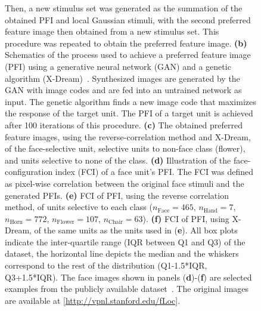 \documentclass[sn-mathphys-num]{sn-jnl}%
\theoremstyle{thmstyleone}%
\theoremstyle{thmstyletwo}%
\theoremstyle{thmstylethree}%
\begin{document}
\begin{figure}[!htb]
{		%
		Then, a new stimulus set was generated as the summation of the obtained PFI and local Gaussian stimuli, with the second preferred feature image then obtained from a new stimulus set.
		This procedure was repeated to obtain the preferred feature image.
		\textbf{(b)} Schematics of the process used to achieve a preferred feature image (PFI) using a generative neural network (GAN) and a genetic algorithm (X-Dream)~\cite{ponce2019evolving}.
		Synthesized images are generated by the GAN with image codes and are fed into an untrained network as input.
		The genetic algorithm finds a new image code that maximizes the response of the target unit.
		The PFI of a target unit is achieved after 100 iterations of this procedure.
		\textbf{(c)} The obtained preferred feature images, using the reverse-correlation method and X-Dream, of the face-selective unit, selective units to non-face class (flower), and units selective to none of the class.
		\textbf{(d)} Illustration of the face-configuration index (FCI) of a face unit's PFI.
		The FCI was defined as pixel-wise correlation between the original face stimuli and the generated PFIs.
		\textbf{(e)} FCI of PFI, using the reverse correlation method, of units selective to each class ($ n_\textrm{Face} = 465 $, $ n_\textrm{Hand} = 7 $, $ n_\textrm{Horn} = 772 $, $ n_\textrm{Flower} = 107 $, $ n_\textrm{Chair} = 63 $).
		\textbf{(f)} FCI of PFI, using X-Dream, of the same units as the units used in (\textbf{e}).
		All box plots indicate the inter-quartile range (IQR between Q1 and Q3) of the dataset,
		the horizontal line depicts the median and the whiskers correspond to the rest of the distribution (Q1-1.5*IQR, Q3+1.5*IQR).
		The face images shown in panels (\textbf{d})-(\textbf{f}) are selected examples from the publicly available dataset~\cite{stigliani2015temporal}.
		The original images are available at [\url{http://vpnl.stanford.edu/fLoc}].
	} \label{fig:fig_2}
\end{figure}
\end{document}
